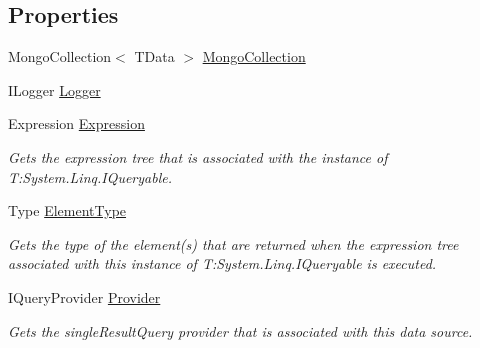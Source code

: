 \subsection*{Properties}
\begin{DoxyCompactItemize}
\item 
Mongo\+Collection$<$ T\+Data $>$ \hyperlink{classCqrs_1_1Mongo_1_1DataStores_1_1MongoDataStore_aa183a8ce44ec16d755f1e4fbe5ec4b10_aa183a8ce44ec16d755f1e4fbe5ec4b10}{Mongo\+Collection}
\item 
I\+Logger \hyperlink{classCqrs_1_1Mongo_1_1DataStores_1_1MongoDataStore_a29e943482b60be2d3d253af59d3fc5eb_a29e943482b60be2d3d253af59d3fc5eb}{Logger}
\item 
Expression \hyperlink{classCqrs_1_1Mongo_1_1DataStores_1_1MongoDataStore_a1a151694ae4eef805bd64aa7a3ae70ed_a1a151694ae4eef805bd64aa7a3ae70ed}{Expression}
\begin{DoxyCompactList}\small\item\em Gets the expression tree that is associated with the instance of T\+:\+System.\+Linq.\+I\+Queryable. \end{DoxyCompactList}\item 
Type \hyperlink{classCqrs_1_1Mongo_1_1DataStores_1_1MongoDataStore_a0b55d9ca4d8ac206dd7beec30aa123df_a0b55d9ca4d8ac206dd7beec30aa123df}{Element\+Type}
\begin{DoxyCompactList}\small\item\em Gets the type of the element(s) that are returned when the expression tree associated with this instance of T\+:\+System.\+Linq.\+I\+Queryable is executed. \end{DoxyCompactList}\item 
I\+Query\+Provider \hyperlink{classCqrs_1_1Mongo_1_1DataStores_1_1MongoDataStore_ae5de32a7a0da67a8aeaed9653db796ce_ae5de32a7a0da67a8aeaed9653db796ce}{Provider}
\begin{DoxyCompactList}\small\item\em Gets the single\+Result\+Query provider that is associated with this data source. \end{DoxyCompactList}\end{DoxyCompactItemize}


